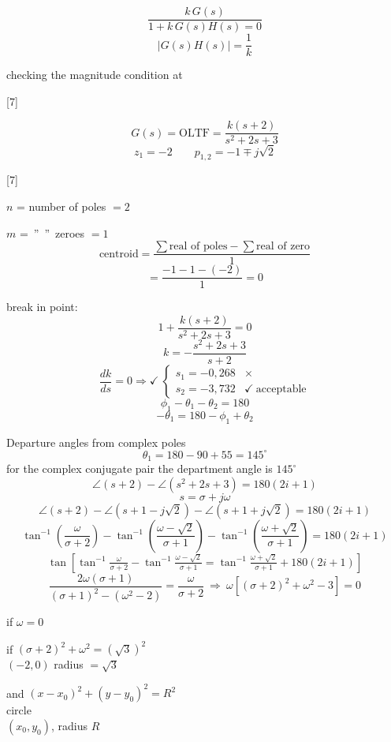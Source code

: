 \documentclass[11pt,a4paper]{article}
\begin{document}
\[ \frac{k\,G(s)}{1+k\,G(s)H(s)=0} \]
\[ |G(s)H(s)| = \frac{1}{k} \]

\noindent checking the magnitude condition at 

[7]

\[ G(s) = \text{OLTF} = \frac{k(s+2)}{s^2+2s+3} \]
\[ z_1=-2 \qquad p_{1,2} = -1\mp j\sqrt{2} \]

[7]

{\color{kirmizikalem}
\noindent $n$ = number of poles $=2$

\noindent $m$ = \,'' \,'' \,zeroes $=1$
\[ \text{centroid} = \frac{\sum \text{real of poles} - \sum \text{real of zero}}{1} \]
\[ = \frac{-1-1-(-2)}{1} = 0 \]}

\noindent break in point:
\[ 1+\frac{k(s+2)}{s^2+2s+3} = 0 \]
\[ k = -\frac{s^2+2s+3}{s+2} \]
\[ \frac{dk}{ds}=0 \Rightarrow \checkmark\ \begin{cases} s_1=-0{,}268 & \times \\ s_2=-3{,}732 & \checkmark\ \text{acceptable} \end{cases} \]
\[ \phi_1-\theta_1-\theta_2 = 180 \]
\[ -\theta_1 = 180-\phi_1+\theta_2 \]

\noindent Departure angles from complex poles
\[ \theta_1 = 180-90+55 = 145^\circ \]
\noindent for the complex conjugate pair the department angle is $145^\circ$
\[ \angle(s{+}2)-\angle(s^2{+}2s{+}3)=180(2i+1) \]
\[ s=\sigma+j\omega \]
\[ \angle(s{+}2)-\angle(s{+}1{-}j\sqrt2)-\angle(s{+}1{+}j\sqrt2)=180(2i+1) \]
\[ \tan^{-1}\!\left(\frac{\omega}{\sigma+2}\right)-\tan^{-1}\!\left(\frac{\omega-\sqrt2}{\sigma+1}\right)-\tan^{-1}\!\left(\frac{\omega+\sqrt2}{\sigma+1}\right)=180(2i+1) \]
\[ \tan\!\left[\tan^{-1}\!\tfrac{\omega}{\sigma+2}-\tan^{-1}\!\tfrac{\omega-\sqrt2}{\sigma+1}=\tan^{-1}\!\tfrac{\omega+\sqrt2}{\sigma+1}+180(2i+1)\right] \]
\[ \frac{2\omega(\sigma+1)}{(\sigma+1)^2-(\omega^2-2)}=\frac{\omega}{\sigma+2}\ \Rightarrow\ \omega\left[(\sigma+2)^2+\omega^2-3\right]=0 \]

\noindent if $\omega=0$

\noindent if $(\sigma+2)^2+\omega^2=(\sqrt{3})^2$ \\
\hspace*{2.5em}$(-2,0)$ \quad radius $=\sqrt{3}$

\noindent and $(x-x_0)^2+(y-y_0)^2=R^2$ \\
\hspace*{2.5em}circle \\
\hspace*{2.5em}$(x_0,y_0)$, radius $R$
\end{document}
